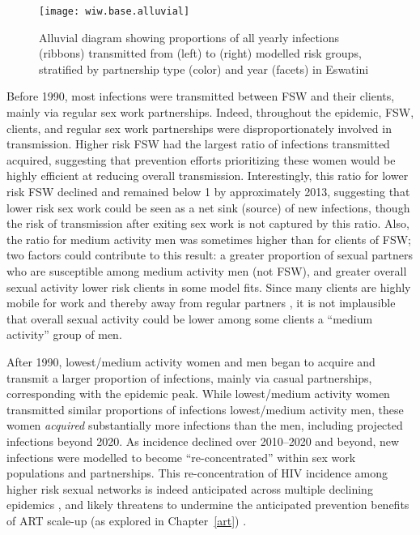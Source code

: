 \begin{figure}
  \texttt{[image: wiw.base.alluvial]}
  \caption{Alluvial diagram showing proportions of all yearly infections (ribbons)
    transmitted from (left) to (right) modelled risk groups,
    stratified by partnership type (color) and year (facets) in Eswatini}
  \label{fig:wiw.base.alluvial}
\end{figure}
\par
Before 1990, most infections were transmitted between FSW and their clients,
mainly via regular sex work partnerships.
Indeed, throughout the epidemic, FSW, clients, and regular sex work partnerships
were disproportionately involved in transmission.
Higher risk FSW had the largest ratio of infections transmitted \vs acquired,
suggesting that prevention efforts prioritizing these women
would be highly efficient at reducing overall transmission.
Interestingly, this ratio for lower risk FSW declined and remained below 1
by approximately 2013, %
suggesting that lower risk sex work could be seen as a net sink (\vs source) of new infections,
though the risk of transmission after exiting sex work is not captured by this ratio.
Also, the ratio for medium activity men was sometimes higher than for clients of FSW;
two factors could contribute to this result:
a greater proportion of sexual partners who are susceptible among medium activity men (\ie not FSW),
and greater overall sexual activity \vs lower risk clients in some model fits.
Since many clients are highly mobile for work
and thereby away from regular partners \cite{Carael2006,Matovu2012,Makhakhe2017},
it is not implausible that overall sexual activity could be
lower among some clients \vs a ``medium activity'' group of men.
\par
After 1990, lowest/medium activity women and men began to acquire and transmit
a larger proportion of infections, mainly via casual partnerships,
corresponding with the epidemic peak.
While lowest/medium activity women transmitted similar proportions of infections
\vs lowest/medium activity men,
these women \emph{acquired} substantially more infections than the men,
including projected infections beyond 2020.
As incidence declined over 2010--2020 and beyond,
new infections were modelled to become ``re-concentrated''
within sex work populations and partnerships.
This re-concentration of HIV incidence among higher risk sexual networks
is indeed anticipated across multiple declining epidemics \cite{Brown2019,Ortblad2019},
and likely threatens to undermine the anticipated prevention benefits of ART scale-up
(as explored in Chapter~\ref{art}) \cite{Baral2019}.
